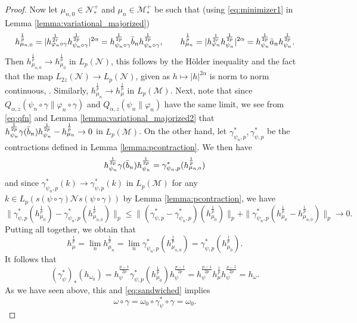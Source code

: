 \documentclass[12pt]{article}
\theoremstyle{definition}
\theoremstyle{remark}
\numberwithin{equation}{section}
\def\Me{\mathcal M}
\def\Ne{\mathcal N}
\def\ffi{\varphi}
\begin{document}
\begin{proof}
Now let $\mu_{n,0}\in \Ne_*^+$ and $\mu_n\in \Me_*^+$ be such that (using  \eqref{eq:minimizer1}
in Lemma \ref{lemma:variational_majorized})
\begin{align*}
h_{\mu_{n,0}}^{\frac 1p}= |h_{\ffi_n\circ\gamma}^{1\over 2r}h_{\psi_n\circ\gamma}^{1\over 2p}|^{2\alpha}=
h_{\psi_n\circ\gamma}^{\frac 1{2p}}\bar b_{n}
h_{\psi_n\circ\gamma}^{\frac1{2p}},\qquad
h_{\mu_{n}}^{\frac1p}=|h_{\ffi_n}^{1\over 2r}h_{\psi_n}^{1\over 2p}|^{2\alpha}= h_{\psi_n}^{\frac 1{2p}}\bar a_{n}
h_{\psi_n}^{\frac1{2p}}. 
\end{align*}
Then $h_{\mu_{n,0}}^{\frac1p}\to h_{\mu_0}^{\frac1p}$ in $L_p(\Ne)$, this follows by the H\"older
inequality and the fact that the map $L_{2z}(\Ne)\to L_p(\Ne)$, given as $h\mapsto
|h|^{2\alpha}$ is norm to norm continuous, \cite{kosaki1984applicationsuc}. Similarly,
$h_{\mu_n}^{\frac1p}\to h_\mu^{\frac1p}$ in $L_p(\Me)$. 
Next, note that since
$Q_{\alpha,z}(\psi_n\circ\gamma\|\ffi_n\circ\gamma)$ and $Q_{\alpha,z}(\psi_n\|\ffi_n)$
have the same limit, we see from \eqref{eq:qfn} and Lemma
\ref{lemma:variational_majorized2} that 
$h_{\psi_n}^{\frac 1{2p}}\gamma(\bar b_{n})h_{\psi_n}^{1\over 2p}-h_{\mu_n}^{\frac1p}\to
0$ in $L_p(\Me)$.  On the other hand, let $\gamma^*_{\psi_n,p}, \gamma^*_{\psi,p}$ be the
contractions defined in Lemma \ref{lemma:pcontraction}. We
then have 
\[
h_{\psi_n}^{\frac 1{2p}}\gamma(\bar b_{n})h_{\psi_n}^{1\over
2p}=\gamma_{\psi_{n},p}^*(h_{\mu_{n,0}}^{\frac1p})
\]
and since $\gamma^*_{\psi_{n},p}(k)\to \gamma^*_{\psi,p}(k)$ in $L_p(\Me)$ for any
$k\in L_p(s(\psi\circ\gamma)\Ne s(\psi\circ\gamma))$ by Lemma \ref{lemma:pcontraction}, we have  
\[
\|\gamma^*_{\psi,p}(h_{\mu_0}^{\frac1p})-\gamma_{\psi_{n},p}^*(h_{\mu_{n,0}}^{\frac1p})\|_p\le
\|(\gamma^*_{\psi,p}-\gamma^*_{\psi_{n},p})(h_{\mu_0}^{\frac1p})\|_p+
\|\gamma^*_{\psi_{n},p}(h_{\mu_0}^{\frac1p}-h_{\mu_{n,0}}^{\frac1p})\|_p\to 0.
\]
Putting all together, we obtain that 
\[
h_\mu^{\frac1p}=\lim_n h_{\mu_n}^{\frac1p}=\lim_n
\gamma^*_{\psi_{n},p}(h_{\mu_{n,0}}^{\frac1p})=\gamma^*_{\psi,p}(h_{\mu_0}^{\frac1p}).
\]
It follows that 
\[
(\gamma^*_{\psi})_*(h_{\omega_0})=h_{\psi}^{\frac{p-1}{2p}}\gamma^*_{\psi,p}(h_{\mu_0}^{\frac1p})h_{\psi}^{\frac{p-1}{2p}}=h_{\psi}^{\frac{p-1}{2p}}h_\mu^{\frac1p}h_{\psi}^{\frac{p-1}{2p}}=h_\omega.
\]
As we have seen above, this  and \eqref{eq:sandwiched} implies 
\[
\omega\circ\gamma= \omega_0\circ \gamma_\psi^*\circ\gamma=\omega_0.
\]



\end{proof}
\end{document}
